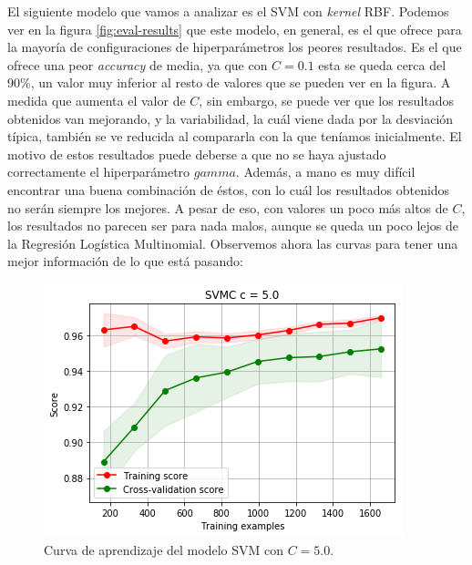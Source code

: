 \documentclass[11pt,a4paper]{article}
\begin{document}
El siguiente modelo que vamos a analizar es el SVM con \textit{kernel} RBF. Podemos ver en la figura \ref{fig:eval-results} que este modelo, en
general, es el que ofrece para la mayoría de configuraciones de hiperparámetros los peores resultados. Es el que
ofrece una peor \textit{accuracy} de media, ya que con $C = 0.1$ esta se queda cerca del 90\%, un valor muy inferior al resto de valores que se
pueden ver en la figura. A medida que aumenta el valor de $C$, sin embargo, se puede ver que los resultados obtenidos van mejorando, y la
variabilidad, la cuál viene dada por la desviación típica, también se ve reducida al compararla con la que teníamos inicialmente. El motivo de estos
resultados puede deberse a que no se haya ajustado correctamente el hiperparámetro $gamma$. Además, a mano es muy difícil encontrar una buena
combinación de éstos, con lo cuál los resultados obtenidos no serán siempre los mejores. A pesar de eso, con valores un poco más altos de $C$, los
resultados no parecen ser para nada malos, aunque se queda un poco lejos de la Regresión Logística Multinomial. Observemos ahora
las curvas para tener una mejor información de lo que está pasando:

\begin{figure}[H]
    \centering
    \includegraphics[scale=0.5]{img/lc-svm-c-5.png}
    \caption{Curva de aprendizaje del modelo SVM con $C=5.0$.}
    \label{fig:lc-svm-c-5}
\end{figure}
\end{document}
